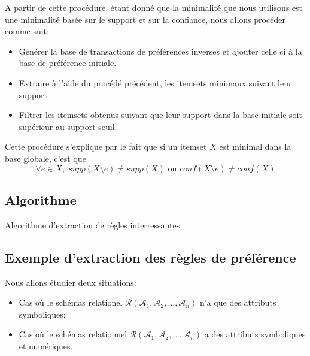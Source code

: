 \documentclass[a4paper,12pt,openany,oneside]{article}
\begin{document}
 	A partir de cette procédure, étant donné que la minimalité que nous utilisons est une minimalité basée sur le support et sur la confiance, nous allons procéder comme suit:
 	\begin{itemize}
 	 \item Générer la base de transactions de préférences inverses et ajouter celle ci à la base de préférence initiale.
 	 \item Extraire à l'aide du procédé précédent, les itemsets minimaux suivant leur support
 	 \item Filtrer les itemsets obtenus suivant que leur support dans la base initiale soit supérieur au support seuil. 
 	\end{itemize}
 		
 		Cette procédure s'explique par le fait que si un itemset $X$ est minimal dans la base globale, c'est que 
 		\[
 		\forall e\in X,\; supp(X\setminus e)\neq supp(X)\text{ ou }conf(X\setminus e)\neq conf(X)
 		\]
    
    
    
    \subsection{Algorithme}
    
 \begin{algorithm}[H]
 
 
 	
 	\caption{Algorithme d'extraction de règles interressantes}
 \end{algorithm}
 
 
 
 
 	
 
 
 
    
    
    \subsection{Exemple d'extraction des règles de préférence}
    Nous allons étudier deux situations:
    \begin{itemize}
    		\item Cas où le schémas relationel $\mathcal{R}(\mathcal{A}_{1},\mathcal{A}_{2},...,\mathcal{A}_{n})$ n'a que des attributs symboliques;
    		\item Cas où le schémas relationnel $\mathcal{R}(\mathcal{A}_{1},\mathcal{A}_{2},...,\mathcal{A}_{n})$ a des attributs symboliques et numériques.\\
    \end{itemize}
    
\end{document}
